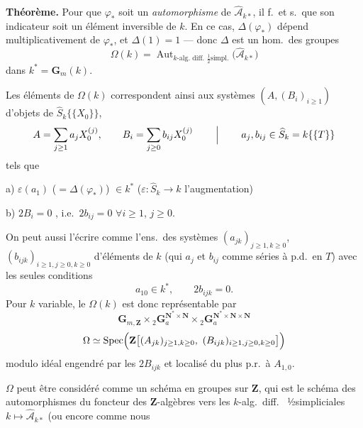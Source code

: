 \documentclass[11pt,a4paper]{article}
\begin{document}
\textbf{Théorème.} Pour que $\varphi_{*}$ soit un \emph{automorphisme} de $\widehat{\mathcal{A}}_{k*}$, il f.\ et s.\ que son indicateur soit un élément inversible de $k$. En ce cas, $\Delta(\varphi_{*})$ dépend multiplicativement de $\varphi_{*}$, et $\Delta(1)=1$ — donc $\Delta$ est un hom.\ des groupes
\[
\Omega(k)=\operatorname{Aut}_{k\text{-alg.\ diff.\ }\frac{1}{2}\text{simpl.}}\bigl(\widehat{\mathcal{A}}_{k*}\bigr)
\]
dans $k^{*}=\mathbf{G}_{m}(k)$.

Les  éléments de $\Omega(k)$ correspondent ainsi aux systèmes $(A,(B_{i})_{i\geq 1})$ d'objets de $\widehat{S}_{k}\{\{X_{0}\}\}$,
\[
A=\sum_{j\geq 1}a_{j}X_{0}^{(j)},\qquad
B_{i}=\sum_{j\geq 0}b_{ij}X_{0}^{(j)}\qquad\Bigm|\qquad a_{j}, b_{ij}\in\widehat{S}_{k}=k\{\{T\}\}
\]
tels que

a) $\varepsilon(a_{1})$ ($=\Delta(\varphi_{*})$) $\in k^{*}$ \quad ($\varepsilon\colon\widehat{S}_{k}\to k$ l'augmentation)

b) $2B_{i}=0$ , i.e.\ $2b_{ij}=0$ $\forall i\geq 1$, $j\geq 0$.

On peut aussi l'écrire comme l'ens.\ des systèmes $(a_{jk})_{j\geq 1,k\geq 0}$, $(b_{ijk})_{i\geq 1,j\geq 0,k\geq 0}$ d'éléments de $k$ (qui   $a_{j}$ et $b_{ij}$ comme séries à p.d.\ en $T$) avec les seules conditions
\[
a_{10}\in k^{*},\qquad 2b_{ijk}=0.
\]
Pour $k$ variable, le \struck{\ill{}}  $\Omega(k)$ est donc représentable par 
\[
\mathbf{G}_{m,\mathbf{Z}}\times{}_{2}\mathbf{G}_{a}^{\mathbf{N}^{*}\times\mathbf{N}}\times{}_{2}\mathbf{G}_{a}^{\mathbf{N}^{*}\times\mathbf{N}\times\mathbf{N}}
\]
\[
\Omega\simeq\operatorname{Spec}\Bigl(\mathbf{Z}\bigl[(A_{jk})_{j\geq 1,k\geq 0},\ (B_{ijk})_{i\geq 1,j\geq 0,k\geq 0}\bigr]\Bigr)
\]
modulo idéal engendré par les $2B_{ijk}$ et localisé du plus p.r.\ à $A_{1,0}$.

$\Omega$ peut être considéré comme un schéma en groupes sur $\mathbf{Z}$, qui est le schéma des automorphismes du foncteur des $\mathbf{Z}$-algèbres vers les $k$-alg.\ diff.\  ½simpliciales $k\mapsto\widehat{\mathcal{A}}_{k*}$ (ou encore comme nous
\end{document}
